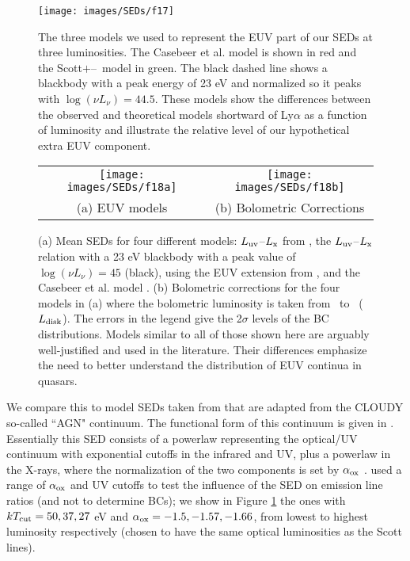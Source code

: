 \begin{figure}[t]
 \centering
 \texttt{[image: images/SEDs/f17]}
 \caption[EUV models]{ The three models we used to represent the EUV part of our SEDs at three luminosities. The Casebeer et al. model is shown in red and the Scott$+$\luv--\lx\ model in green.  The black dashed line shows a blackbody with a peak energy of 23 eV and normalized so it peaks with $\log{(\nu L_{\nu})}=44.5$.
 These models show the differences between the observed and theoretical models shortward of Ly$\alpha$ as a function of luminosity and illustrate the relative level of our hypothetical extra EUV component.}
 \label{three_models}
\end{figure}

\begin{figure*}
 \centering
  \begin{tabular}{cc}
 \texttt{[image: images/SEDs/f18a]} & \texttt{[image: images/SEDs/f18b]} \\
 (a) EUV models & (b) Bolometric Corrections
 \end{tabular}
 
  \caption[Mean EUV SEDs and bolometric corrections for each model]{(a) Mean SEDs for four different models: $L_{{\rm uv}}$--$L_{{\rm x}}$ from \citet[][blue]{Steffen:2006}, the $L_{{\rm uv}}$--$L_{{\rm x}}$ relation with a 23 eV blackbody with a peak value of $\log{(\nu L_{\nu})}=45$ (black), using the EUV extension from \citet[][green]{Scott:2004}, and the Casebeer et al. model \citep[][red]{Casebeer:2006}.
  (b) Bolometric corrections for the four models in (a) where the bolometric luminosity is taken from \onemum\ to \twokev\ ($L_{{\rm disk}}$). The errors in the legend give the 2$\sigma$ levels of the BC distributions.
  Models similar to all of those shown here are arguably well-justified and used in the literature. Their differences emphasize the need to better understand the distribution of EUV continua in quasars.}
  \label{bcs}
\end{figure*}

We compare this to model SEDs taken from \citet{Casebeer:2006} that 
are adapted from the CLOUDY \citep{Ferland:2002} so-called ``AGN" continuum.
The functional form of this continuum is given in \citet[][Equation (A1)]{Casebeer:2006}.  Essentially this SED consists of a powerlaw
representing the optical/UV continuum with exponential cutoffs in the
infrared and UV, plus a powerlaw in the X-rays, where the
normalization of the two components is set by $\alpha_{{\rm ox}}$ \citep[calibrated to ][]{Wilkes:1994}.  
\citet{Casebeer:2006} used a range of $\alpha_{{\rm ox}}$ and UV cutoffs to test the
influence of the SED on emission line ratios (and not to determine BCs); we
show in Figure \ref{three_models} the ones with $kT_{{\rm cut}}=50, 37, 27$ eV and $\alpha_{{\rm ox}}=-1.5, -1.57, -1.66$, from lowest to highest luminosity respectively (chosen to have the same optical luminosities as the Scott lines).

